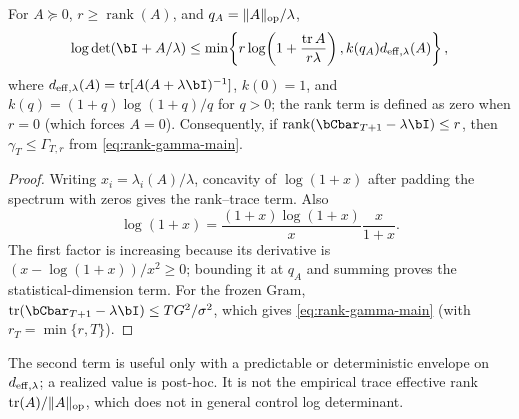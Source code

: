 \begin{lemma}\label{lem:rank-logdet}
For $A\succeq0$, $r\ge\operatorname{rank}(A)$, and
$q_A=\|A\|_{\rm op}/\lambda$,
\begin{equation}\label{eq:rank-logdet}
\log\det(\bI+A/\lambda)\le
\min\!\left\{r\log\!\left(1+\frac{\operatorname{tr}A}{r\lambda}\right),
 k(q_A)d_{{\rm eff},\lambda}(A)\right\},
\end{equation}
where $d_{{\rm eff},\lambda}(A)=\operatorname{tr}[A(A+\lambda\bI)^{-1}]$,
$k(0)=1$, and $k(q)=(1+q)\log(1+q)/q$ for $q>0$; the rank term is defined
as zero when $r=0$ (which forces $A=0$).  Consequently, if
$\operatorname{rank}(\bCbar_{T+1}-\lambda\bI)\le r$, then
$\gamma_T\le\Gamma_{T,r}$ from \eqref{eq:rank-gamma-main}.
\end{lemma}
\begin{proof}
Writing $x_i=\lambda_i(A)/\lambda$, concavity of $\log(1+x)$ after padding
the spectrum with zeros gives the rank--trace term.  Also
\[
 \log(1+x)=\frac{(1+x)\log(1+x)}x\frac{x}{1+x}.
\]
The first factor is increasing because its derivative is
$(x-\log(1+x))/x^2\ge0$; bounding it at $q_A$ and summing proves the
statistical-dimension term.  For the frozen Gram,
$\operatorname{tr}(\bCbar_{T+1}-\lambda\bI)\le TG^2/\sigma^2$, which gives
\eqref{eq:rank-gamma-main} (with $r_T=\min\{r,T\}$).
\end{proof}
The second term is useful only with a predictable or deterministic envelope on
$d_{{\rm eff},\lambda}$; a realized value is post-hoc.  It is not the empirical
trace effective rank $\operatorname{tr}(A)/\|A\|_{\rm op}$, which does not in
general control log determinant.

